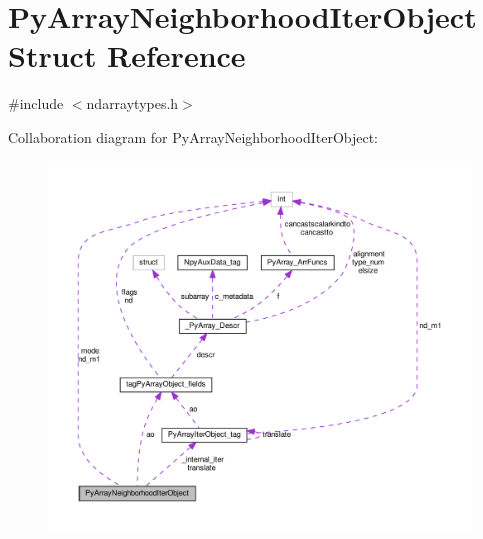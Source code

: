 \hypertarget{structPyArrayNeighborhoodIterObject}{}\section{Py\+Array\+Neighborhood\+Iter\+Object Struct Reference}
\label{structPyArrayNeighborhoodIterObject}


{\ttfamily \#include $<$ndarraytypes.\+h$>$}



Collaboration diagram for Py\+Array\+Neighborhood\+Iter\+Object\+:
\nopagebreak
\begin{figure}[H]
\begin{center}
\leavevmode
\includegraphics[width=350pt]{structPyArrayNeighborhoodIterObject__coll__graph}
\end{center}
\end{figure}
